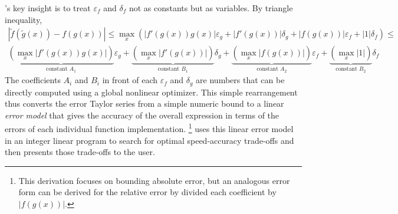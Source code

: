 \documentclass[paper.tex]{subfiles}
\begin{document}
\name's key insight is to treat $\varepsilon_f$ and $\delta_f$
  not as constants but as variables.
By triangle inequality,
\begin{multline}\label{linearform}
  | \tilde{f}(\tilde{g}(x)) - f(g(x)) | \le
\max_x \left( |f'(g(x))g(x)| \varepsilon_g + |f'(g(x))| \delta_g + |f(g(x))|
\varepsilon_f + | 1 | \delta_f \right) \le \\
\underbrace{\left( \max_x |f'(g(x))g(x)| \right)}_{\text{constant }A_1} \varepsilon_g
+ \underbrace{\left( \max_x |f'(g(x))| \right)}_{\text{constant }B_1} \delta_g
+ \underbrace{\left( \max_x |f(g(x))| \right)}_{\text{constant }A_2} \varepsilon_f
+ \underbrace{\left( \max_x | 1 | \right)}_{\text{constant }B_2} \delta_f
\end{multline}
The coefficients $A_i$ and $B_i$
  in front of each $\varepsilon_f$ and $\delta_g$
  are numbers that can be directly computed
  using a global nonlinear optimizer.
This simple rearrangement thus
  converts the error Taylor series from a simple numeric bound
  to a linear \emph{error model}
  that gives the accuracy of the overall expression
  in terms of the errors of each individual function implementation.%
\footnote{
This derivation focuses on bounding absolute error,
  but an analogous error form can be derived for the relative error
  by divided each coefficient by $|f(g(x))|$.}
\name uses this linear error model in an integer linear program
  to search for optimal speed-accuracy trade-offs
  and then presents those trade-offs to the user.
\end{document}

